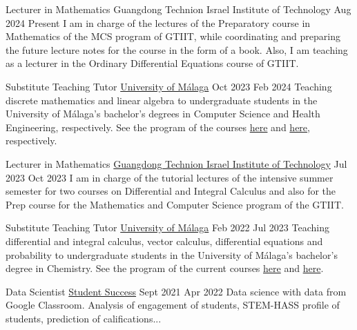 \nopagebreak
\begin{employment}
		{Lecturer in Mathematics}
		{Guangdong Technion Israel Institute of Technology}
		{Aug 2024}
		{Present}
		{I am in charge of the lectures of the Preparatory course in Mathematics of the MCS program of GTIIT, while coordinating and preparing the future lecture notes for the course in the form of a book. Also, I am teaching as a lecturer in the Ordinary Differential Equations course of GTIIT.}
\end{employment}


\begin{employment}
    {Substitute Teaching Tutor}
    {\href{https://www.uma.es/}{University of Málaga}}
    {Oct 2023}
    {Feb 2024}
    {Teaching discrete mathematics and linear algebra to undergraduate students in the University of Málaga's bachelor's degrees in Computer Science and Health Engineering, respectively. See the program of the courses \href{https://sara.uma.es/ht/2023/ProgramasAsignaturas_Titulacion_5389_AsigUMA_55366.pdf}{here} and \href{https://sara.uma.es/ht/2023/ProgramasAsignaturas_Titulacion_5157_AsigUMA_53012.pdf}{here}, respectively.}
\end{employment}

\begin{employment}
		{Lecturer in Mathematics}
		{\href{https://www.gtiit.edu.cn/en/}{Guangdong Technion Israel Institute of Technology}}
		{Jul 2023}
		{Oct 2023}
		{I am in charge of the tutorial lectures of the intensive summer semester for two courses on Differential and Integral Calculus and also for the Prep course for the Mathematics and Computer Science program of the GTIIT.}
\end{employment}

\begin{employment}
    {Substitute Teaching Tutor}
    {\href{https://www.uma.es/}{University of Málaga}}
    {Feb 2022}
    {Jul 2023}
    {Teaching differential and integral calculus, vector calculus, differential equations and probability to undergraduate students in the University of Málaga's bachelor's degree in Chemistry. See the program of the current courses \href{https://oas.sci.uma.es:8443/ht/2022/ProgramasAsignaturas_Titulacion_5004_AsigUMA_51634.pdf}{here} and \href{https://oas.sci.uma.es:8443/ht/2022/ProgramasAsignaturas_Titulacion_5004_AsigUMA_51639.pdf}{here}.}
\end{employment}

\begin{employment}
    {Data Scientist}
    {\href{https://studentsuccess.app/es/}{Student Success}}
    {Sept 2021}
    {Apr 2022}
    {Data science with data from Google Classroom. Analysis of  engagement of students, STEM-HASS profile of students, prediction of  califications...}
\end{employment}

